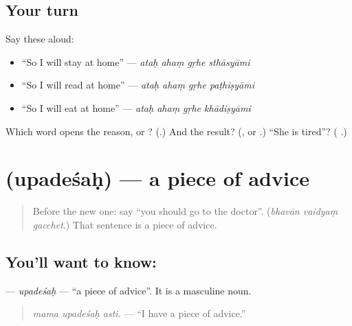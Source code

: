 \subsection*{Your turn}
Say these aloud:

\begin{itemize}
\raggedright
  \item \textquotedblleft{}So I will stay at home\textquotedblright{} — \emph{ataḥ ahaṃ gṛhe sthāsyāmi}
  \item \textquotedblleft{}So I will read at home\textquotedblright{} — \emph{ataḥ ahaṃ gṛhe paṭhiṣyāmi}
  \item \textquotedblleft{}So I will eat at home\textquotedblright{} — \emph{ataḥ ahaṃ gṛhe khādiṣyāmi}
\end{itemize}

\begin{tcolorbox}[breakable,colback=teal!4,colframe=teal!35!black,title={Before you move on}]
Which word opens the reason, \textbf{} or \textbf{}? (\textbf{}.) And the result? (\textbf{}, or \textbf{}.) \textquotedblleft{}She is tired\textquotedblright{}? (\textbf{  }.)
\end{tcolorbox}
\section[\texorpdfstring{\sk{उपदेशः} (upadeśaḥ)}{उपदेशः (upadeśaḥ)}]{ (upadeśaḥ) — a piece of advice}

\label{lesson:SA-C279-upadesah}



\begin{quote}
Before the new one: say \textquotedblleft{}you should go to the doctor\textquotedblright{}. (\emph{bhavān vaidyaṃ gacchet}.) That sentence is a piece of advice.
\end{quote}

\subsection*{You'll want to know: }
\textbf{} — \emph{upadeśaḥ} — \textquotedblleft{}a piece of advice\textquotedblright{}. It is a masculine noun.

\begin{quote}
\textbf{  }
\end{quote}

\begin{quote}
\emph{mama upadeśaḥ asti.} — \textquotedblleft{}I have a piece of advice.\textquotedblright{}
\end{quote}

